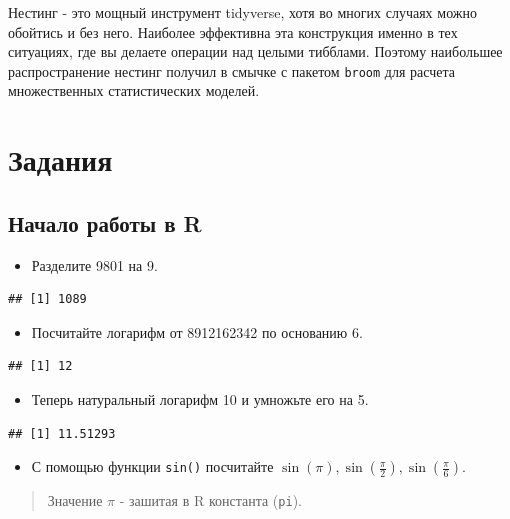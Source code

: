 \documentclass[]{book}
\providecommand{\tightlist}{%
  \setlength{\itemsep}{0pt}\setlength{\parskip}{0pt}}
\begin{document}
Нестинг - это мощный инструмент tidyverse, хотя во многих случаях можно
обойтись и без него. Наиболее эффективна эта конструкция именно в тех
ситуациях, где вы делаете операции над целыми тибблами. Поэтому
наибольшее распространение нестинг получил в смычке с пакетом
\texttt{broom} для расчета множественных статистических моделей.

\chapter{Задания}\label{tasks}

\section{Начало работы в R}\label{task_begin}

\begin{itemize}
\tightlist
\item
  Разделите 9801 на 9.
\end{itemize}

\begin{verbatim}
## [1] 1089
\end{verbatim}

\begin{itemize}
\tightlist
\item
  Посчитайте логарифм от 8912162342 по основанию 6.
\end{itemize}

\begin{verbatim}
## [1] 12
\end{verbatim}

\begin{itemize}
\tightlist
\item
  Теперь натуральный логарифм 10 и умножьте его на 5.
\end{itemize}

\begin{verbatim}
## [1] 11.51293
\end{verbatim}

\begin{itemize}
\tightlist
\item
  С помощью функции \texttt{sin()} посчитайте
  \(\sin (\pi), \sin \left(\frac{\pi}{2}\right), \sin \left(\frac{\pi}{6}\right)\).
\end{itemize}

\begin{quote}
Значение \(\pi\) - зашитая в R константа (\texttt{pi}).
\end{quote}
\end{document}
